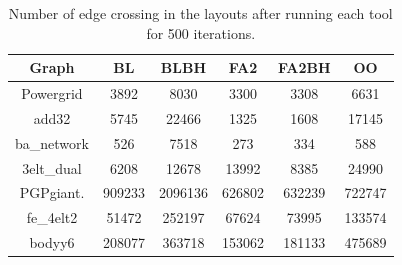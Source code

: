 \documentclass[conference]{article}
\begin{document}
\begin{table}[]
\caption{Number of edge crossing in the layouts after running each tool for 500 iterations.}
\centering
\begin{tabular}{|c|c|c|c|c|c|}
\hline
\textbf{Graph} & \textbf{BL} & \textbf{BLBH} & \textbf{FA2} & \textbf{FA2BH} & \textbf{OO} \\ \hline
Powergrid      & 3892        & 8030          & 3300         & 3308           & 6631        \\ \hline
add32          & 5745        & 22466         & 1325         & 1608           & 17145       \\ \hline
ba\_network    & 526         & 7518          & 273          & 334            & 588         \\ \hline
3elt\_dual     & 6208        & 12678         & 13992        & 8385           & 24990       \\ \hline
PGPgiant.      & 909233      & 2096136       & 626802       & 632239         & 722747      \\ \hline
fe\_4elt2      & 51472       & 252197        & 67624        & 73995          & 133574      \\ \hline
bodyy6         & 208077      & 363718        & 153062       & 181133         & 475689      \\ \hline
\end{tabular}
\end{table}
\end{document}
